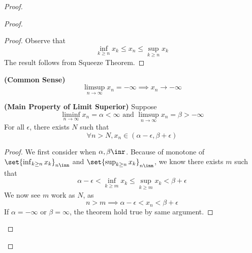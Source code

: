 \documentclass{report}
\begin{document}
\begin{proof}
\begin{proof}
\begin{proof}
Observe that 
\begin{equation*}
\inf_{k\geq n}x_k\leq x_n\leq \sup_{k\geq n}x_k
\end{equation*}
The result follows from Squeeze Theorem.
\end{proof}
\begin{corollary}
\label{4.4.4}
\textbf{(Common Sense)}
\begin{equation*}
\limsup_{n\to\infty} x_n=-\infty \implies x_n \to -\infty
\end{equation*}
\end{corollary}
\begin{theorem}
\label{4.4.5}
\textbf{(Main Property of Limit Superior)} Suppose 
\begin{equation*}
\liminf_{n\to\infty}  x_n=\alpha<\infty \text{ and }\limsup_{n\to\infty}  x_n=\beta>-\infty \end{equation*}
For all $\epsilon $, there exists $N$ such that 
\begin{equation*}
\forall n>N, x_n\in (\alpha -\epsilon ,\beta +\epsilon )
\end{equation*}
\end{theorem}
\begin{proof}
We first consider when $\alpha ,\beta \inr$. Because of monotone of $\set{\inf_{k\geq n} x_k}_{n\inn}$ and $\set{\sup_{k\geq n} x_k}_{n\inn}$, we know there exists $m$ such that 
 \begin{equation*}
\alpha -\epsilon <\inf_{k\geq m}x_k \leq \sup_{k\geq m} x_k <\beta +\epsilon 
\end{equation*}
We now see $m$ work as $N$, as 
 \begin{equation*}
n>m \implies \alpha -\epsilon <x_n<\beta +\epsilon 
\end{equation*}
If $\alpha =-\infty$ or $\beta =\infty$, the theorem hold true by same argument. 
\end{proof}
\end{proof}
\end{proof}
\end{document}
